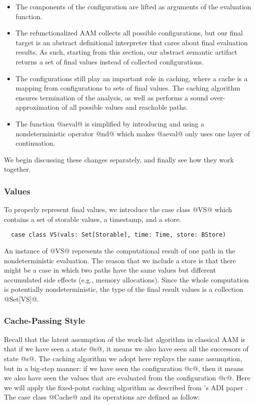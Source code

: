 \documentclass[acmsmall, screen]{acmart}\settopmatter{}
\begin{document}
\begin{itemize}
  \item The components of the configuration are lifted as arguments of the evaluation
    function.
  \item The refunctionalized AAM collects all possible configurations, but our final target is an
    abstract definitional interpreter that cares about final evaluation results.
    As such, starting from this section, our abstract semantic artifact returns a set of final
    values instead of collected configurations.
  \item The configurations still play an important role in caching, where a cache
    is a mapping from configurations to sets of final values. The caching algorithm
    ensures termination of the analysis, as well as performs a sound over-approximation
    of all possible values and reachable paths.
  \item The function @aeval@ is simplified by introducing and using a nondeterministic
    operator @nd@ which makes @aeval@ only uses one layer of continuation.
\end{itemize}

We begin discussing these changes separately, and finally see how they work together.

\subsubsection{Values}
To properly represent final values, we introduce the case class @VS@ which
contains a set of storable values, a timestamp, and a store.

\begin{lstlisting}
  case class VS(vals: Set[Storable], time: Time, store: BStore)
\end{lstlisting}

An instance of @VS@ represents the computational result of one path in the nondeterministic
evaluation. The reason that we include a store is that there might be a case in which two
paths have the same values but different accumulated side effects (e.g., memory allocations).
Since the whole computation is potentially nondeterministic, the type of the final result
values is a collection @Set[VS]@.

\subsubsection{Cache-Passing Style}
Recall that the latent assumption of the work-list algorithm in classical AAM is that
if we have seen a state @s@, it means we also have seen all the successors of state @s@.
The caching algorithm we adopt here replays the same assumption, but in a big-step
manner: if we have seen the configuration @c@, then it means we also have seen the
values that are evaluated from the configuration @c@.
Here we will apply the fixed-point caching algorithm as described from
\citeauthor{darais2017abstracting}'s ADI paper \cite{darais2017abstracting}.
The case class @Cache@ and its operations are defined as follow:
\end{document}
